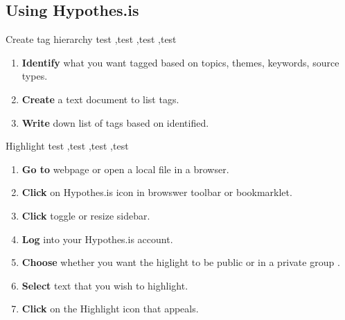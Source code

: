 \documentclass[10pt,a4paper]{article}
\begin{document}
\subsection{Using Hypothes.is}

\begin{textbox}{Create tag hierarchy}
test  \sep test \sep test \sep test

\bigskip

\begin{enumerate}
\item \textbf{Identify} what you want tagged based on topics, themes, keywords, source types. 
\item \textbf{Create} a text document to list tags.
\item \textbf{Write} down list of tags based on identified.
\end{enumerate}

\end{textbox}


\begin{textbox}{Highlight}
test  \sep test \sep test \sep test

\bigskip

\begin{enumerate}
\item \textbf{Go to} webpage or open a local file in a browser. 
\item \textbf{Click} on Hypothes.is icon in browswer toolbar or bookmarklet.
\item \textbf{Click} toggle or resize sidebar.
\item \textbf{Log} into your Hypothes.is account.
\item \textbf{Choose} whether you want the higlight to be public or in a private group .
\item \textbf{Select} text that you wish to highlight.
\item \textbf{Click} on the Highlight icon that appeals.

\end{enumerate}

\end{textbox}
\end{document}
